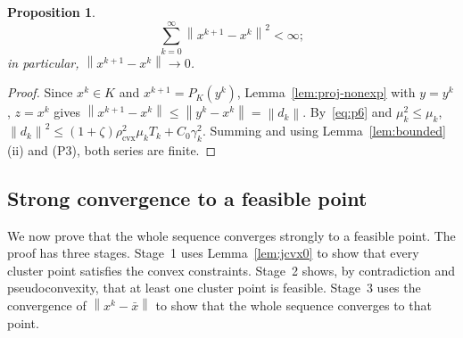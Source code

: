 \documentclass[]{interact}
\theoremstyle{plain}
\newtheorem{proposition}[theorem]{Proposition}
\theoremstyle{definition}
\theoremstyle{remark}
\newcommand{\norm}[1]{\left\lVert #1 \right\rVert}
\newcommand{\cvx}{\mathrm{cvx}}
\begin{document}
\begin{proposition}\label{prop:regularity}
\[
\sum_{k=0}^{\infty}\norm{x^{k+1}-x^k}^{2}<\infty;
\]
in particular, $\norm{x^{k+1}-x^k}\to0$.
\end{proposition}
\begin{proof}
Since $x^k\in K$ and $x^{k+1}=P_K(y^k)$, Lemma~\ref{lem:proj-nonexp} with $y=y^k$, $z=x^k$ gives $\norm{x^{k+1}-x^k}\le\norm{y^k-x^k}=\norm{d_k}$. By~\eqref{eq:p6} and $\mu_k^2\le\mu_k$, $\norm{d_k}^2\le(1+\zeta)\rho_{\cvx}^2\mu_k T_k+C_0\gamma_k^2$. Summing and using Lemma~\ref{lem:bounded}(ii) and (P3), both series are finite.
\end{proof}

\subsection{Strong convergence to a feasible point}\label{ssec:strong}
We now prove that the whole sequence converges strongly to a feasible point. The proof has three stages. Stage~1 uses Lemma~\ref{lem:jcvx0} to show that every cluster point satisfies the convex constraints. Stage~2 shows, by contradiction and pseudoconvexity, that at least one cluster point is feasible. Stage~3 uses the convergence of $\norm{x^k-\bar x}$ to show that the whole sequence converges to that point.
\end{document}
